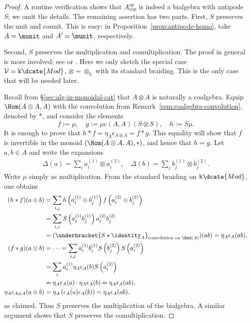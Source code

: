 \begin{proof}
	A routine verification shows that $A^{\mathrm{op}}_{\mathrm{cop}}$ is
	indeed a bialgebra with antipode $S$; we omit the details. The remaining
	assertion has two parts. First, $S$ preserves the unit and counit. This is
	easy: in Proposition~\ref{prop:antipode-homo}, take $A=\munit$ and
	$A'=\munit$, respectively.

	Second, $S$ preserves the multiplication and comultiplication. The proof
	in general is more involved; see \cite[\S 9, Proposition 2]{JS91} or
	\cite[Proposition 1.22]{AM10}. Here we only sketch the special case
	$\mathcal{V}=\Bbbk\dcate{Mod}$, $\otimes=\otimes_{\Bbbk}$ with its
	standard braiding. This is the only case that will be needed later.

	Recall from \S\ref{sec:alg-in-monoidal-cat} that $A\otimes A$ is naturally
	a coalgebra. Equip $\Hom(A\otimes A,A)$ with the convolution from
	Remark~\ref{rem:coalgebra-convolution}, denoted by $\ast$, and consider the
	elements
	\[ f := \mu, \quad g := \mu c(A, A) (S \otimes S), \quad h := S \mu. 
	\]
	It is enough to prove that
	$h\ast f=\eta_A\epsilon_{A\otimes A}=f\ast g$. This equality will show
	that $f$ is invertible in the monoid
	$(\Hom(A\otimes A,A),\ast)$, and hence that $h=g$. Let $a,b\in A$ and
	write the expansions
	\begin{gather*}
		\Delta(a) = \sum_i a_i^{(1)} \otimes a_i^{(2)}, \quad
		\Delta(b) = \sum_j b_j^{(1)} \otimes b_j^{(2)}.
	\end{gather*}
	Write $\mu$ simply as multiplication. From the standard braiding on
	$\Bbbk\dcate{Mod}$, one obtains
	\begin{align*}
		(h \ast f)(a \otimes b) & = \sum_{i, j} h\left(a^{(1)}_i \otimes b^{(1)}_j\right) f\left(a^{(2)}_i \otimes b^{(2)}_j\right) \\
		& = \sum_{i, j} S\left( a^{(1)}_i b^{(1)}_j \right) a^{(2)}_i b^{(2)}_j \\
		& = (\underbracket{S \star \identity_A}_{\text{convolution on }\End(A)})(ab) = \eta_A \epsilon_A (ab), \\
		(f \ast g)(a \otimes b) & = \cdots = \sum_{i, j} a^{(1)}_i b^{(1)}_j S\left( b^{(2)}_j \right) S\left( a^{(2)}_i \right) \\
		& = \sum_i a^{(1)}_i \eta_A \epsilon_A(b) S\left( a^{(2)}_i \right) \\
		& = \eta_A \epsilon_A (a) \cdot \eta_A \epsilon_A (b) = \eta_A \epsilon_A(ab), \\
		\eta_A \epsilon_{A \otimes A}(a \otimes b) & = \eta_A\left( \epsilon_A(a)\epsilon_A(b) \right) = \eta_A \epsilon_A(ab),
	\end{align*}
	as claimed. Thus $S$ preserves the multiplication of the bialgebra. A
	similar argument shows that $S$ preserves the comultiplication.
\end{proof}

